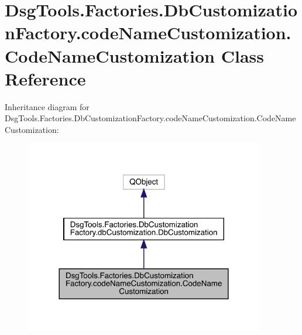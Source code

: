 \hypertarget{class_dsg_tools_1_1_factories_1_1_db_customization_factory_1_1code_name_customization_1_1_code_name_customization}{}\section{Dsg\+Tools.\+Factories.\+Db\+Customization\+Factory.\+code\+Name\+Customization.\+Code\+Name\+Customization Class Reference}
\label{class_dsg_tools_1_1_factories_1_1_db_customization_factory_1_1code_name_customization_1_1_code_name_customization}


Inheritance diagram for Dsg\+Tools.\+Factories.\+Db\+Customization\+Factory.\+code\+Name\+Customization.\+Code\+Name\+Customization\+:
\nopagebreak
\begin{figure}[H]
\begin{center}
\leavevmode
\includegraphics[width=296pt]{class_dsg_tools_1_1_factories_1_1_db_customization_factory_1_1code_name_customization_1_1_code_ne44b1aae5f843452b8362d6615eef854}
\end{center}
\end{figure}


